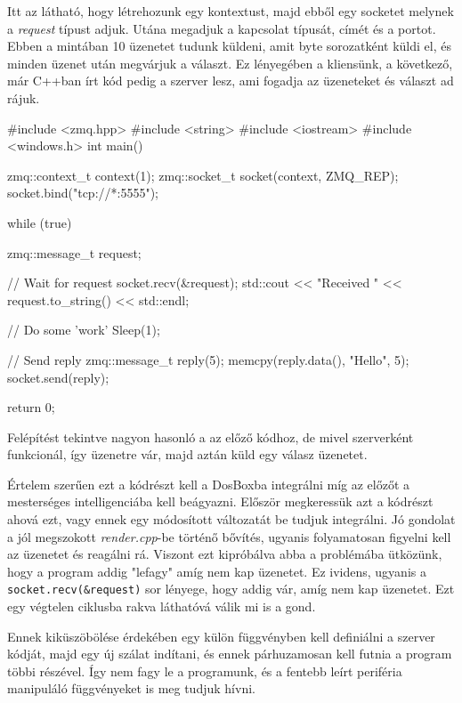 Itt az látható, hogy létrehozunk egy kontextust, majd ebből egy socketet melynek a \textit{request} típust adjuk. 
Utána megadjuk a kapcsolat típusát, címét és a portot. Ebben a mintában 10 üzenetet tudunk küldeni, amit byte sorozatként küldi el, és minden üzenet után megvárjuk a választ. Ez lényegében a kliensünk, a következő, már C++ban írt kód pedig a szerver lesz, ami fogadja az üzeneteket és választ ad rájuk.

\begin{cpp}
    #include <zmq.hpp>
    #include <string>
    #include <iostream>
    #include <windows.h>
    int main()
    {
        zmq::context_t context(1);
        zmq::socket_t socket(context, ZMQ_REP);
        socket.bind("tcp://*:5555");
    
        while (true) {
            zmq::message_t request;
    
            //  Wait for request
            socket.recv(&request);
            std::cout << "Received " << request.to_string() << std::endl;
    
            //  Do some 'work'
            Sleep(1);
    
            //  Send reply 
            zmq::message_t reply(5);
            memcpy(reply.data(), "Hello", 5);
            socket.send(reply);
        }
        return 0;
    }
\end{cpp}

Felépítést tekintve nagyon hasonló a az előző kódhoz, de mivel szerverként funkcionál, így üzenetre vár, majd aztán küld egy válasz üzenetet. 

Értelem szerűen ezt a kódrészt kell a DosBoxba integrálni míg az előzőt a mesterséges intelligenciába kell beágyazni. Először megkeressük azt a kódrészt ahová ezt, vagy ennek egy módosított változatát be tudjuk integrálni. Jó gondolat a jól megszokott \textit{render.cpp}-be történő bővítés, ugyanis folyamatosan figyelni kell az üzenetet és reagálni rá. Viszont ezt kipróbálva abba a problémába ütközünk, hogy a program addig "lefagy" amíg nem kap üzenetet. Ez ividens, ugyanis a \verb|socket.recv(&request)| sor lényege, hogy addig vár, amíg nem kap üzenetet. Ezt egy végtelen ciklusba rakva láthatóvá válik mi is a gond.

Ennek kiküszöbölése érdekében egy külön függvényben kell definiálni a szerver kódját, majd egy új szálat indítani, és ennek párhuzamosan kell futnia a program többi részével. Így nem fagy le a programunk, és a fentebb leírt periféria manipuláló függvényeket is meg tudjuk hívni.

